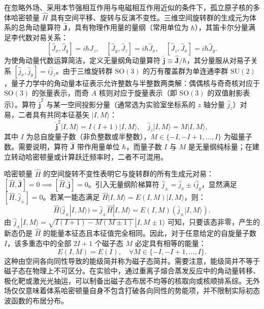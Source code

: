 在忽略外场、采用本节强相互作用与电磁相互作用近似的条件下，孤立原子核的多体哈密顿量 $\hat{H}$ 具有空间平移、旋转与反演不变性。三维空间旋转群的生成元为体系的总角动量算符 $\hat{\mathbf{J}}$，具有物理作用量的量纲（常用单位为 $\hbar$），其笛卡尔分量满足李代数对易关系：
\begin{equation}\label{eq:2-1-1}
[\hat{J}_x, \hat{J}_y] = i \hbar \hat{J}_z, \quad [\hat{J}_y, \hat{J}_z] = i \hbar \hat{J}_x, \quad [\hat{J}_z, \hat{J}_x] = i \hbar \hat{J}_y.
\end{equation}
为使角动量代数运算简洁，定义无量纲角动量算符 $\hat{\mathbf{j}} \equiv \hat{\mathbf{J}}/\hbar$，其分量服从对易子关系 $[\hat{j}_x, \hat{j}_y] = i \hat{j}_z$。由于三维旋转群 $\mathrm{SO}(3)$ 的万有覆盖群为单连通李群 $\mathrm{SU}(2)$，量子力学中的角动量本征表示允许整数与半整数两类解：偶偶核与奇奇核对应于 $\mathrm{SO}(3)$ 的张量表示，而奇 $A$ 核则对应于旋量表示（即 $\mathrm{SO}(3)$ 的双值射影表示）。算符 $\hat{\mathbf{j}}^2$ 与某一空间投影分量（通常选为实验室坐标系的 $z$ 轴分量 $\hat{j}_z$）对易，二者具有共同本征基矢 $|I, M\rangle$：
\begin{equation}\label{eq:2-1-2}
\hat{\mathbf{j}}^2 |I, M\rangle = I(I+1) |I, M\rangle, \quad \hat{j}_z |I, M\rangle = M |I, M\rangle,
\end{equation}
其中 $I$ 为总自旋量子数（非负整数或半整数），$M \in \{-I, -I+1, \dots, I\}$ 为磁量子数。需要说明，算符 $\hat{\mathbf{J}}$ 带作用量单位 $\hbar$，而量子数 $I$ 与 $M$ 是无量纲纯标量；在建立转动哈密顿量或计算跃迁频率时，二者不可混用。

哈密顿量 $\hat{H}$ 的空间旋转不变性表明它与旋转群的所有生成元对易：$[\hat{H}, \hat{\mathbf{J}}] = 0 \implies [\hat{H}, \hat{\mathbf{j}}] = 0$。引入无量纲阶梯算符 $\hat{j}_\pm = \hat{j}_x \pm i \hat{j}_y$，显然满足 $[\hat{H}, \hat{j}_\pm] = 0$。若某一能态满足 $\hat{H} |I, M\rangle = E(I, M) |I, M\rangle$，则：
\begin{equation}\label{eq:2-1-3}
\hat{H} (\hat{j}_\pm |I, M\rangle) = \hat{j}_\pm \hat{H} |I, M\rangle = E(I, M) (\hat{j}_\pm |I, M\rangle).
\end{equation}
由 $\hat{j}_\pm |I, M\rangle = \sqrt{I(I+1) - M(M \pm 1)} \, |I, M \pm 1\rangle$ 可知，只要该态非零，产生的新态仍是 $\hat{H}$ 的能量本征态且本征值完全相同。因此，对于任意给定的自旋量子数 $I$，该多重态中的全部 $2I+1$ 个磁子态 $M$ 必定具有相等的能量：
\begin{equation}\label{eq:2-1-4}
E(I, M) = E(I), \quad \forall M \in \{-I, -I+1, \dots, I\}.
\end{equation}
这种由空间各向同性导致的能级简并称为磁子态简并。需要注意，能级简并不等于磁子态在物理上不可区分。在实验中，通过重离子熔合蒸发反应中的角动量转移、极化靶或激光光抽运，可以制备出磁子态布居不均等的核取向或核顺排系综。无外场仅仅意味着体系哈密顿量自身不包含打破各向同性的势能项，并不限制实际初态波函数的布居分布。


